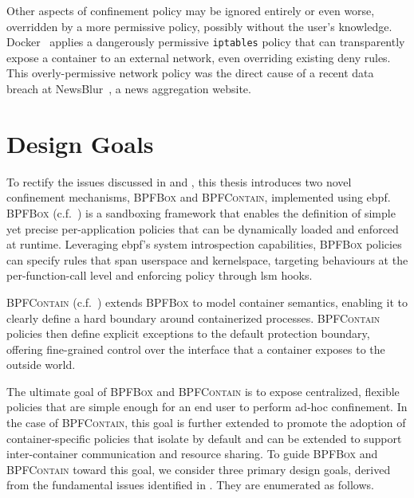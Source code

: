 \documentclass[
  fontsize=12pt,
  titlepage=firstiscover,
  paper=letter,
oneside,
  cleardoublepage=plain,
  parskip=half-,
  DIV=10,
  parindent,
  appendixprefix,
  chapterprefix,
  listof=totoc,
]{scrbook}
\newcommand{\bpfbox}{\textsc{BPFBox}}
\newcommand{\bpfcontain}{\textsc{BPFContain}}
\begin{document}
Other aspects of confinement policy may be ignored entirely or even worse, overridden by
a more permissive policy, possibly without the user's knowledge.
Docker~\cite{docker_security} applies a dangerously permissive \texttt{iptables} policy
that can transparently expose a container to an external network, even overriding existing
deny rules. This overly-permissive network policy was the direct cause of a recent data
breach at NewsBlur~\cite{newsblur}, a news aggregation website.



\section{Design Goals}\label{s:cp-design}



To rectify the issues discussed in  and , this
thesis introduces two novel confinement mechanisms, \bpfbox{} and \bpfcontain{},
implemented using \gls{ebpf}. \bpfbox{} (c.f.\ ) is a sandboxing framework
that enables the definition of simple yet precise per-application policies that can be
dynamically loaded and enforced at runtime. Leveraging \gls{ebpf}'s system
introspection capabilities, \bpfbox{} policies can specify rules that span userspace and
kernelspace, targeting behaviours at the per-function-call level and enforcing policy
through \gls{lsm} hooks.

\bpfcontain{} (c.f.\ ) extends \bpfbox{} to model container semantics,
enabling it to clearly define a hard boundary around containerized processes.
\bpfcontain{} policies then define explicit exceptions to the default protection boundary,
offering fine-grained control over the interface that a container exposes to the outside
world.

The ultimate goal of \bpfbox{} and \bpfcontain{} is to expose centralized, flexible
policies that are simple enough for an end user to perform ad-hoc confinement. In the case
of \bpfcontain{}, this goal is further extended to promote the adoption of
container-specific policies that isolate by default and can be extended to support
inter-container communication and resource sharing. To guide \bpfbox{} and \bpfcontain{}
toward this goal, we consider three primary design goals, derived from the fundamental
issues identified in . They are enumerated as follows.
\end{document}

